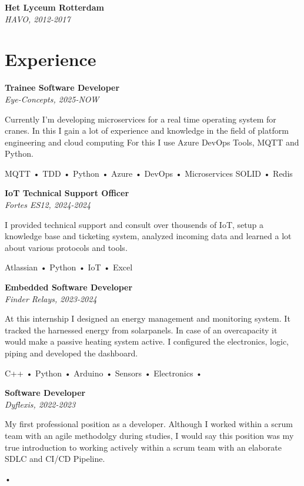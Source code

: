 \documentclass[11pt, twoside, a4paper, titlepage]{article}
\begin{document}
\begin{tcolorbox}[boxsep=0mm, left=0mm, right=0mm, top=0mm, bottom=0mm, height=23.5cm]
\begin{minipage}[t]{14cm}
\begin{tcolorbox}[grow to left by=0.0cm, colframe=white, colback=white, height=23.4cm]
			\textbf{Het Lyceum Rotterdam}\\
			\emph{HAVO, 2012-2017}
			
			\section*{Experience}
			\textbf{Trainee Software Developer}\\
			\emph{Eye-Concepts, 2025-NOW}\\
			\parbox{13cm}{Currently I'm developing microservices for a real time operating system for cranes. In this I gain a lot of experience and knowledge in the field of platform engineering and cloud computing For this I use Azure DevOps Tools, MQTT and Python.}
			\parbox{13cm}{ MQTT • TDD • Python • Azure • DevOps • Microservices SOLID • Redis }
			
			\vspace*{0.3cm}
			
			\textbf{IoT Technical Support Officer}\\
			\emph{Fortes ES12, 2024-2024}\\
			\parbox{13cm}{I provided technical support and consult over thousends of IoT, setup a knowledge base and ticketing system, analyzed incoming data and learned a lot about various protocols and tools.}
			\parbox{13cm}{ Atlassian • Python • IoT • Excel }
			
			\vspace*{0.3cm}
			
			\textbf{Embedded Software Developer}\\
			\emph{Finder Relays, 2023-2024}\\
			\parbox{13cm}{At this internship I designed an energy management and monitoring system. It tracked the harnessed energy from solarpanels. In case of an overcapacity it would make a passive heating system active. I configured the electronics, logic, piping and developed the dashboard.}
			\parbox{13cm}{ C++ • Python • Arduino • Sensors • Electronics •
			
			\vspace*{0.3cm}
			
			\textbf{Software Developer}\\
			\emph{Dyflexis, 2022-2023}\\
			\parbox{13cm}{My first professional position as a developer. Although I worked within a scrum team with an agile methodolgy during studies, I would say this position was my true introduction to working actively within a scrum team with an elaborate SDLC and CI/CD Pipeline.}
			\parbox{13cm}{  •
			
}}
\end{tcolorbox}
\end{minipage}
\end{tcolorbox}
\end{document}
